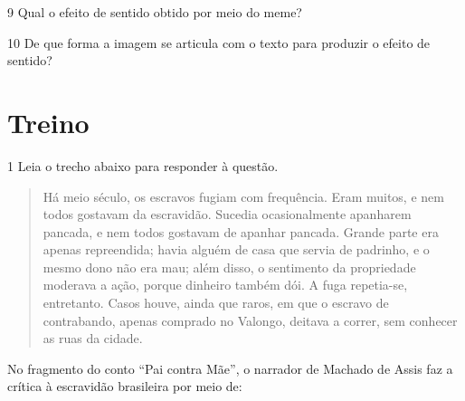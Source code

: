 
\num{9} Qual o efeito de sentido obtido por meio do meme? 


\num{10} De que forma a imagem se articula com o texto para produzir
o efeito de sentido?


\section{Treino}

\num{1} Leia o trecho abaixo para responder à questão. 

\begin{quote}

Há meio século, os escravos fugiam com frequência. Eram muitos, e nem todos
gostavam da escravidão. Sucedia ocasionalmente apanharem pancada, e nem todos
gostavam de apanhar pancada. Grande parte era apenas repreendida; havia alguém de
casa que servia de padrinho, e o mesmo dono não era mau; além disso, o sentimento da
propriedade moderava a ação, porque dinheiro também dói. A fuga repetia-se,
entretanto. Casos houve, ainda que raros, em que o escravo de contrabando, apenas
comprado no Valongo, deitava a correr, sem conhecer as ruas da cidade.

\end{quote}


No fragmento do conto ``Pai contra Mãe'', o narrador de Machado de Assis faz a crítica
à escravidão brasileira por meio de:

